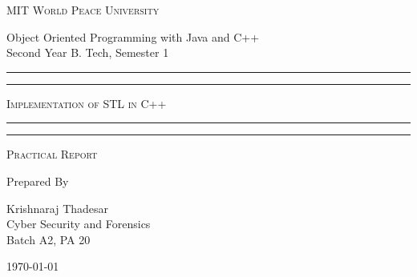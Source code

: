 \documentclass[11pt]{article}
\begin{document}
\begin{titlepage}
	\centering


	\huge\textsc{
		MIT World Peace University
	}\\

	\vspace{0.75\baselineskip} %

	\LARGE{
		Object Oriented Programming with Java and C++\\
		Second Year B. Tech, Semester 1
	}

	\vfill %


	\rule{\textwidth}{1.6pt}\vspace*{-\baselineskip}\vspace*{2pt}
	\rule{\textwidth}{0.6pt}
	\vspace{0.75\baselineskip} %



	\huge{\textsc{
			Implementation of STL in C++
		}} \\



	\vspace{0.5\baselineskip} %
	\rule{\textwidth}{0.6pt}\vspace*{-\baselineskip}\vspace*{2.8pt}
	\rule{\textwidth}{1.6pt}

	\vspace{1\baselineskip} %


	\LARGE\textsc{
		Practical Report
	} %
	\vfill


	Prepared By
	\vspace{0.5\baselineskip} %

	\Large{
		Krishnaraj Thadesar \\
		Cyber Security and Forensics\\
		Batch A2, PA 20
	}


	\vspace{0.5\baselineskip} %
	\today

\end{titlepage}
\end{document}
